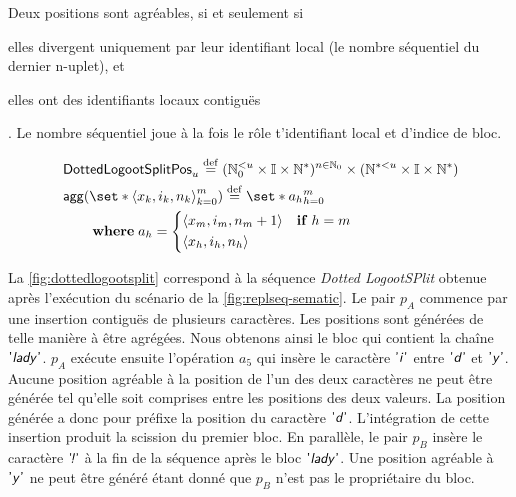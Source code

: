 Deux positions sont agréables, si et seulement si \begin{inlinelist}\item elles divergent uniquement par leur identifiant local (le nombre séquentiel du dernier n-uplet), et \item elles ont des identifiants locaux contiguës\end{inlinelist}.
Le nombre séquentiel joue à la fois le rôle t'identifiant local et d'indice de bloc.

\begin{align*}
&\trm{DottedLogootSplitPos}_u \defeq (\mathbb{N}_0^{< u} \times \mathbb{I} \times \mathbb{N}^*)^{n \in \mathbb{N}_0} \times (\mathbb{N}^{* < u} \times \mathbb{I} \times \mathbb{N}^*)\\
&\begin{aligned}
    \MoveEqLeft \trm{agg}(\set*{\tuple*{x_k, i_k, n_k}}_{k=0}^m) \defeq \set*{a_h}_{h=0}^m\\
    &\where a_h = \begin{dcases}
        \tuple*{x_m, i_m, n_m + 1} & \when h = m\\
        \tuple*{x_h, i_h, n_h}
    \end{dcases}
\end{aligned}
\end{align*}

La \autoref{fig:dottedlogootsplit} correspond à la séquence \emph{Dotted LogootSPlit} obtenue après l'exécution du scénario de la \autoref{fig:replseq-sematic}.
Le pair $p_A$ commence par une insertion contiguës de plusieurs caractères.
Les positions sont générées de telle manière à être agrégées.
Nous obtenons ainsi le bloc qui contient la chaîne $\textsf{'\textit{lady}'}$.
$p_A$ exécute ensuite l'opération $a_5$ qui insère le caractère $\textsf{'\textit{i}'}$ entre $\textsf{'\textit{d}'}$ et $\textsf{'\textit{y}'}$.
Aucune position agréable à la position de l'un des deux caractères ne peut être générée tel qu'elle soit comprises entre les positions des deux valeurs.
La position générée a donc pour préfixe la position du caractère $\textsf{'\textit{d}'}$.
L'intégration de cette insertion produit la scission du premier bloc.
En parallèle, le pair $p_B$ insère le caractère $\textsf{'\textit{\negthinspace!}'}$ à la fin de la séquence après le bloc $\textsf{'\textit{lady}'}$.
Une position agréable à $\textsf{'\textit{y}'}$ ne peut être généré étant donné que $p_B$ n'est pas le propriétaire du bloc.

